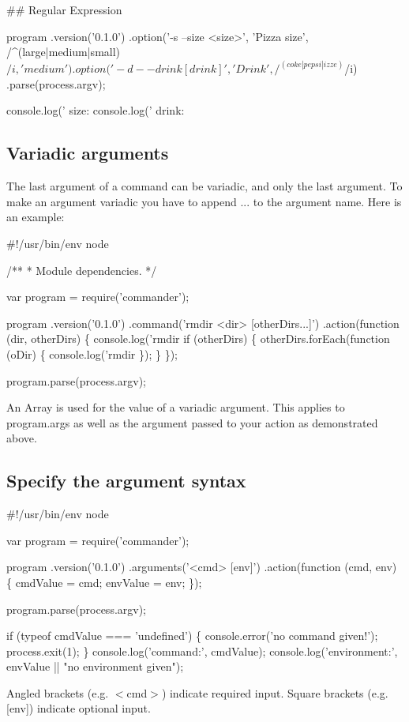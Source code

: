 \#\# Regular Expression 
\begin{DoxyCode}
program
  .version('0.1.0')
  .option('-s --size <size>', 'Pizza size', /^(large|medium|small)$/i, 'medium')
  .option('-d --drink [drink]', 'Drink', /^(coke|pepsi|izze)$/i)
  .parse(process.argv);

console.log(' size: %
console.log(' drink: %
\end{DoxyCode}


\subsection*{Variadic arguments}

The last argument of a command can be variadic, and only the last argument. To make an argument variadic you have to append {\ttfamily ...} to the argument name. Here is an example\+:


\begin{DoxyCode}
#!/usr/bin/env node

/**
 * Module dependencies.
 */

var program = require('commander');

program
  .version('0.1.0')
  .command('rmdir <dir> [otherDirs...]')
  .action(function (dir, otherDirs) \{
    console.log('rmdir %
    if (otherDirs) \{
      otherDirs.forEach(function (oDir) \{
        console.log('rmdir %
      \});
    \}
  \});

program.parse(process.argv);
\end{DoxyCode}


An {\ttfamily Array} is used for the value of a variadic argument. This applies to {\ttfamily program.\+args} as well as the argument passed to your action as demonstrated above.

\subsection*{Specify the argument syntax}


\begin{DoxyCode}
#!/usr/bin/env node

var program = require('commander');

program
  .version('0.1.0')
  .arguments('<cmd> [env]')
  .action(function (cmd, env) \{
     cmdValue = cmd;
     envValue = env;
  \});

program.parse(process.argv);

if (typeof cmdValue === 'undefined') \{
   console.error('no command given!');
   process.exit(1);
\}
console.log('command:', cmdValue);
console.log('environment:', envValue || "no environment given");
\end{DoxyCode}
 Angled brackets (e.\+g. {\ttfamily $<$cmd$>$}) indicate required input. Square brackets (e.\+g. {\ttfamily \mbox{[}env\mbox{]}}) indicate optional input.

